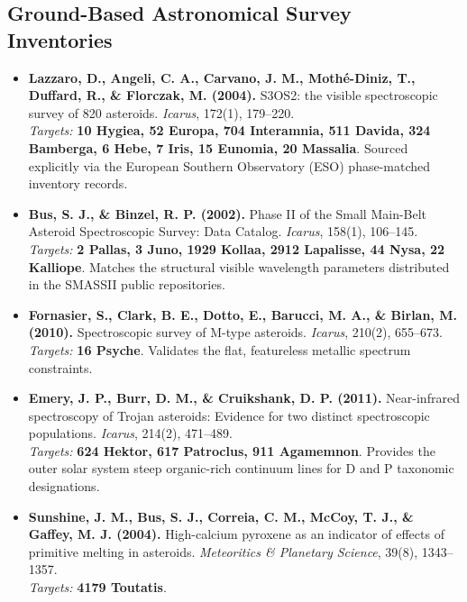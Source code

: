 \documentclass[11pt,letterpaper]{article}
\begin{document}
\subsection{Ground-Based Astronomical Survey Inventories}
\begin{itemize}
    \item \textbf{Lazzaro, D., Angeli, C. A., Carvano, J. M., Moth{\'e}-Diniz, T., Duffard, R., \& Florczak, M. (2004).} S3OS2: the visible spectroscopic survey of 820 asteroids. \textit{Icarus}, 172(1), 179--220. \\
    \textit{Targets:} \textbf{10 Hygiea, 52 Europa, 704 Interamnia, 511 Davida, 324 Bamberga, 6 Hebe, 7 Iris, 15 Eunomia, 20 Massalia}. Sourced explicitly via the European Southern Observatory (ESO) phase-matched inventory records.
    
    \item \textbf{Bus, S. J., \& Binzel, R. P. (2002).} Phase II of the Small Main-Belt Asteroid Spectroscopic Survey: Data Catalog. \textit{Icarus}, 158(1), 106--145. \\
    \textit{Targets:} \textbf{2 Pallas, 3 Juno, 1929 Kollaa, 2912 Lapalisse, 44 Nysa, 22 Kalliope}. Matches the structural visible wavelength parameters distributed in the SMASSII public repositories.
    
    \item \textbf{Fornasier, S., Clark, B. E., Dotto, E., Barucci, M. A., \& Birlan, M. (2010).} Spectroscopic survey of M-type asteroids. \textit{Icarus}, 210(2), 655--673. \\
    \textit{Targets:} \textbf{16 Psyche}. Validates the flat, featureless metallic spectrum constraints.
    
    \item \textbf{Emery, J. P., Burr, D. M., \& Cruikshank, D. P. (2011).} Near-infrared spectroscopy of Trojan asteroids: Evidence for two distinct spectroscopic populations. \textit{Icarus}, 214(2), 471--489. \\
    \textit{Targets:} \textbf{624 Hektor, 617 Patroclus, 911 Agamemnon}. Provides the outer solar system steep organic-rich continuum lines for D and P taxonomic designations.
    
    \item \textbf{Sunshine, J. M., Bus, S. J., Correia, C. M., McCoy, T. J., \& Gaffey, M. J. (2004).} High-calcium pyroxene as an indicator of effects of primitive melting in asteroids. \textit{Meteoritics \& Planetary Science}, 39(8), 1343--1357. \\
    \textit{Targets:} \textbf{4179 Toutatis}.
\end{itemize}
\end{document}
